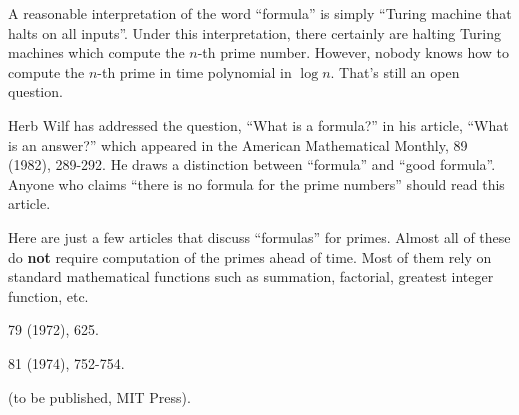 A reasonable interpretation of the word ``formula'' is simply ``Turing
machine that halts on all inputs''.  Under this interpretation, there
certainly are halting Turing machines which compute the $n$-th prime
number.  However, nobody knows how to compute the $n$-th prime in time
polynomial in $\log n$.  That's still an open question.

Herb Wilf has addressed the question, ``What is a formula?'' in his
article, ``What is an answer?'' which appeared in the American
Mathematical Monthly, 89 (1982), 289-292.  He draws a distinction
between ``formula'' and ``good formula''.  Anyone who claims ``there is
no formula for the prime numbers'' should read this article.

Here are just a few articles that discuss ``formulas'' for primes.
Almost all of these do {\bf not} require computation of the primes ahead
of time.  Most of them rely on standard mathematical functions such as
summation, factorial, greatest integer function, etc.


\Ref










 {79 (1972),
  625.}

 {81 (1974),
  752-754.}

\medskip
     
  {(to be
  published, MIT Press).}  
